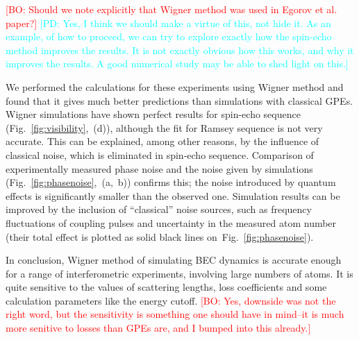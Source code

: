 \documentclass[aps,prl,twocolumn,showpacs,amsmath,amssymb,superscriptaddress]{revtex4-1}
\newcommand{\bogdansremark}[1]{\textcolor{red}{{[}BO: #1{]}}}
\newcommand{\petersremark}[1]{\textcolor{cyan}{{[}PD: #1{]}}}
\newcommand{\figref}[1]{Fig.~\ref{#1}}
\begin{document}
	\bogdansremark{Should we note explicitly that Wigner method was used in Egorov et al. paper?}
	\petersremark{Yes, I think we should make a virtue of this, not hide it.
	As an example, of how to proceed, we can try to explore exactly
	how the spin-echo method improves the results.
	It is not exactly obvious how this works, and why it improves the results.
	A good numerical study may be able to shed light on this.}

We performed the calculations for these experiments using Wigner method and found that
it gives much better predictions than simulations with classical GPEs.
Wigner simulations have shown perfect results for spin-echo sequence (\figref{fig:visibility},~(d)),
although the fit for Ramsey sequence is not very accurate.
This can be explained, among other reasons, by the influence of classical noise,
which is eliminated in spin-echo sequence.
Comparison of experimentally measured phase noise and the noise given by simulations
(\figref{fig:phasenoise},~(a,~b)) confirms this;
the noise introduced by quantum effects is significantly smaller than the observed one.
Simulation results can be improved by the inclusion of ``classical'' noise sources,
such as frequency fluctuations of coupling pulses and uncertainty in the measured atom number
(their total effect is plotted as solid black lines on~\figref{fig:phasenoise}).

In conclusion, Wigner method of simulating BEC dynamics
is accurate enough for a range of interferometric experiments,
involving large numbers of atoms.
It is quite sensitive to the values of scattering lengths,
loss coefficients and some calculation parameters like the energy cutoff.
	\bogdansremark{Yes, downside was not the right word,
	but the sensitivity is something one should have in mind\---it is much more senitive to losses
	than GPEs are, and I bumped into this already.}


\end{document}
